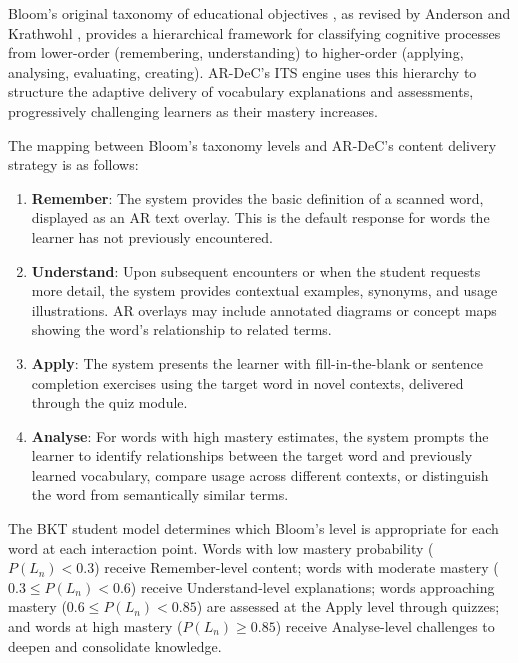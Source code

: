 Bloom's original taxonomy of educational objectives \cite{bloom1956}, as revised by Anderson and Krathwohl \cite{anderson2001}, provides a hierarchical framework for classifying cognitive processes from lower-order (remembering, understanding) to higher-order (applying, analysing, evaluating, creating). AR-DeC's ITS engine uses this hierarchy to structure the adaptive delivery of vocabulary explanations and assessments, progressively challenging learners as their mastery increases.

The mapping between Bloom's taxonomy levels and AR-DeC's content delivery strategy is as follows:

\begin{enumerate}
    \item \textbf{Remember}: The system provides the basic definition of a scanned word, displayed as an AR text overlay. This is the default response for words the learner has not previously encountered.

    \item \textbf{Understand}: Upon subsequent encounters or when the student requests more detail, the system provides contextual examples, synonyms, and usage illustrations. AR overlays may include annotated diagrams or concept maps showing the word's relationship to related terms.

    \item \textbf{Apply}: The system presents the learner with fill-in-the-blank or sentence completion exercises using the target word in novel contexts, delivered through the quiz module.

    \item \textbf{Analyse}: For words with high mastery estimates, the system prompts the learner to identify relationships between the target word and previously learned vocabulary, compare usage across different contexts, or distinguish the word from semantically similar terms.
\end{enumerate}

The BKT student model determines which Bloom's level is appropriate for each word at each interaction point. Words with low mastery probability ($P(L_n) < 0.3$) receive Remember-level content; words with moderate mastery ($0.3 \leq P(L_n) < 0.6$) receive Understand-level explanations; words approaching mastery ($0.6 \leq P(L_n) < 0.85$) are assessed at the Apply level through quizzes; and words at high mastery ($P(L_n) \geq 0.85$) receive Analyse-level challenges to deepen and consolidate knowledge.

